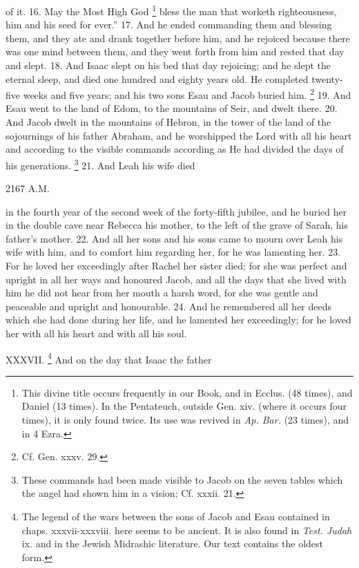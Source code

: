 of it. 16. May the Most High God \footnote{This divine title occurs frequently in our Book, and in Ecclus. (48 times), and Daniel (13 times). In the Pentateuch, outside Gen. xiv. (where it occurs four times), it is only found twice. Its use was revived in \emph{Ap. Bar.} (23 times), and in 4 Ezra.} bless the man that worketh righteousness, him and his seed for ever.'' 17. And he ended commanding them and blessing them, and they ate and drank together before him, and he rejoiced because there was one mind between them, and they went forth from him and rested that day and slept. 18. And Isaac slept on his bed that day rejoicing; and he slept the eternal sleep, and died one hundred and eighty years old. He completed twenty-five weeks and five years; and his two sons Esau and Jacob buried him. \footnote{Cf. Gen. xxxv. 29.} 19. And Esau went to the land of Edom, to the mountains of Seir, and dwelt there. 20. And Jacob dwelt in the mountains of Hebron, in the tower of the land of the sojournings of his father Abraham, and he worshipped the Lord with all his heart and according to the visible commands according as He had divided the days of his generations. \footnote{These commands had been made visible to Jacob on the seven tables which the angel had shown him in a vision; Cf. xxxii. 21.} 21. And Leah his wife died

2167 A.M.

in the fourth year of the second week of the forty-fifth jubilee, and he buried her in the double cave near Rebecca his mother, to the left of the grave of Sarah, his father's mother. 22. And all her sons and his sons came to mourn over Leah his wife with him, and to comfort him regarding her, for he was lamenting her. 23. For he loved her exceedingly after Rachel her sister died; for she was perfect and upright in all her ways and honoured Jacob, and all the days that she lived with him he did not hear from her mouth a harsh word, for she was gentle and peaceable and upright and honourable. 24. And he remembered all her deeds which she had done during her life, and he lamented her exceedingly; for he loved her with all his heart and with all his soul.


XXXVII. \footnote{The legend of the wars between the sons of Jacob and Esau contained in chaps. xxxvii-xxxviii. here seems to be ancient. It is also found in \emph{Test. Judah} ix. and in the Jewish Midrashic literature. Our text contains the oldest form.} And on the day that Isaac the father

